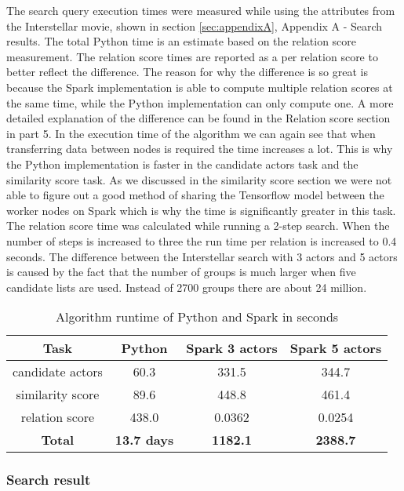 The search query execution times were measured while using the attributes from the Interstellar movie, shown in section \ref{sec:appendixA}, Appendix A - Search results. The total Python time is an estimate based on the relation score measurement. The relation score times are reported as a per relation score to better reflect the difference. The reason for why the difference is so great is because the Spark implementation is able to compute multiple relation scores at the same time, while the Python implementation can only compute one. A more detailed explanation of the difference can be found in the Relation score section in part 5. In the execution time of the algorithm we can again see that when transferring data between nodes is required the time increases a lot. This is why the Python implementation is faster in the candidate actors task and the similarity score task. As we discussed in the similarity score section we were not able to figure out a good method of sharing the Tensorflow model between the worker nodes on Spark which is why the time is significantly greater in this task. The relation score time was calculated while running a 2-step search. When the number of steps is increased to three the run time per relation is increased to 0.4 seconds. The difference between the Interstellar search with 3 actors and 5 actors is caused by the fact that the number of groups is much larger when five candidate lists are used. Instead of 2700 groups there are about 24 million.


\begin{table}[H]
	\centering
    \begin{tabular}{ |c|c|c|c| } 
        \hline
        \textbf{Task} & \textbf{Python} & \textbf{Spark 3 actors} & \textbf{Spark 5 actors}\\ 
        \hline
        candidate actors & 60.3 & 331.5 & 344.7 \\ 
        similarity score & 89.6 & 448.8 & 461.4 \\ 
        relation score & 438.0 & 0.0362 & 0.0254 \\ \hline
        \textbf{Total} & \textbf{13.7 days} & \textbf{1182.1} & \textbf{2388.7} \\ 
        \hline
    \end{tabular}
	\caption{Algorithm runtime of Python and Spark in seconds}
	\label{tab:algorithm runtime}
\end{table}


\subsubsection{Search result}

